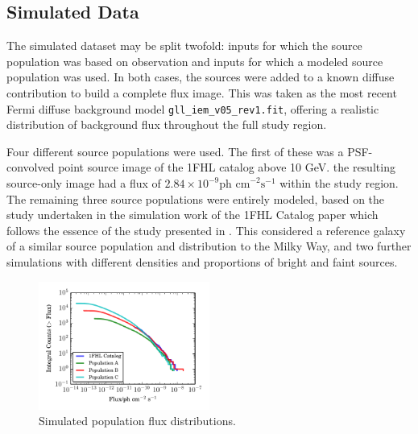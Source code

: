 \documentclass{PoS}
\begin{document}
\subsection{Simulated Data}

The simulated dataset may be split twofold: inputs for which the source population was based on observation and inputs for which a modeled source population was used. In both cases, the sources were added to a known diffuse contribution to build a complete flux image. This was taken as the most recent Fermi diffuse background model \verb|gll_iem_v05_rev1.fit|, offering a realistic distribution of background flux throughout the full study region.

Four different source populations were used. The first of these was a PSF-convolved point source image of the 1FHL catalog above 10 GeV. the resulting source-only image had a flux of $2.84\times 10^{-9} \text{ph cm}^{-2}\text{s}^{-1}$ within the study region. The remaining three source populations were entirely modeled, based on the study undertaken in the simulation work of the 1FHL Catalog paper \cite[p.59]{1fhl} which follows the essence of the study presented in \cite{Strong}. This considered a reference galaxy of a similar source population and distribution to the Milky Way, and two further simulations with different densities and proportions of bright and faint sources.

\begin{figure}
\vspace{-10pt}
      \includegraphics[width=0.5\textwidth]{figures/log_N_log_S.pdf}
  \caption{Simulated population flux distributions.}
\vspace{-10pt}
\end{figure}
\end{document}
